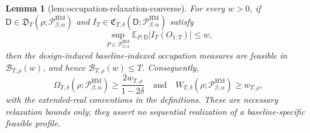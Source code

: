 \documentclass{article}
\newtheorem{lemma}{Lemma}
\begin{document}
\begin{lemma}[lem:occupation-relaxation-converse]\label{lem:occupation-relaxation-converse}
For every \(w>0\), if \(\mathsf D\in\mathfrak D_T(\rho;\mathcal P_{\beta,\alpha}^{\mathrm{HM}})\) and \(I_T\in\mathfrak C_{T,\delta}(\mathsf D;\mathcal P_{\beta,\alpha}^{\mathrm{HM}})\) satisfy
\[
\sup_{P\in\mathcal P_{\beta,\alpha}^{\mathrm{HM}}}
\mathbb E_{P,\mathsf D}|I_T(O_{1:T})|\le w,
\]
then the design-induced baseline-indexed occupation measures are feasible in \(\mathcal B_{T,\rho}(w)\), and hence \(\mathcal B_{T,\rho}(w)\le T\).  Consequently,
\[
\Omega_{T,\delta}(\rho;\mathcal P_{\beta,\alpha}^{\mathrm{HM}})
\ge\frac{2w_{T,\rho}}{1-2\delta}
\quad\text{and}\quad
W_{T,\delta}(\rho;\mathcal P_{\beta,\alpha}^{\mathrm{HM}})\ge w_{T,\rho},
\]
with the extended-real conventions in the definitions.  These are necessary relaxation bounds only; they assert no sequential realization of a baseline-specific feasible profile.
\end{lemma}
\end{document}
